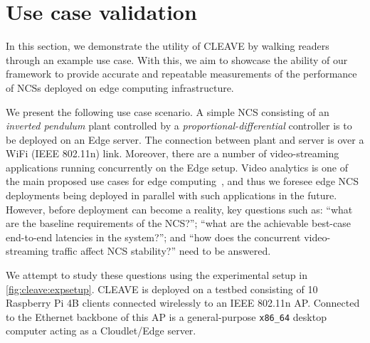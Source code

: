 \section{Use case validation}\label{sec:experiments}

In this section, we demonstrate the utility of \ac{CLEAVE} by walking readers through an example use case.
With this, we aim to showcase the ability of our framework to provide accurate and repeatable measurements of the performance of \acp{NCS} deployed on edge computing infrastructure.

We present the following use case scenario.
A simple \ac{NCS} consisting of an \emph{inverted pendulum} plant controlled by a \emph{proportional-differential} controller is to be deployed on an Edge server.
The connection between plant and server is over a WiFi (IEEE 802.11n) link.
Moreover, there are a number of video-streaming applications running concurrently on the Edge setup.
Video analytics is one of the main proposed use cases for edge computing~\cite{Ananthanarayanan2017Analytics,Yi2017Analytics,Wang2018Analytics}, and thus we foresee edge \ac{NCS} deployments being deployed in parallel with such applications in the future.
However, before deployment can become a reality, key questions such as: 
``what are the baseline requirements of the \ac{NCS}?''; ``what are the achievable best-case end-to-end latencies in the system?''; and
``how does the concurrent video-streaming traffic affect \ac{NCS} stability?'' need to be answered.

We attempt to study these questions using the experimental setup in \cref{fig:cleave:expsetup}.
\ac{CLEAVE} is deployed on a testbed consisting of \num{10} Raspberry Pi 4B  clients connected wirelessly to an IEEE 802.11n \ac{AP}.
Connected to the Ethernet backbone of this \ac{AP} is a general-purpose \verb|x86_64| desktop computer acting as a Cloudlet/Edge server.

% 

